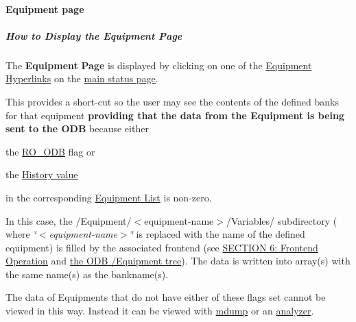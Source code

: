 \par
 \label{index_end}
\hypertarget{index_end}{}
 \paragraph{Equipment page}\label{RC_mhttpd_Equipment_page}
\label{RC_mhttpd_Equipment_page_idx_mhttpd_page_equipment}
\hypertarget{RC_mhttpd_Equipment_page_idx_mhttpd_page_equipment}{}
 \par




\par
\par
 \label{RC_mhttpd_Equipment_page_idx_Equipment_data_display}
\hypertarget{RC_mhttpd_Equipment_page_idx_Equipment_data_display}{}
 \hypertarget{RC_mhttpd_Equipment_page_RC_mhttpd_Equipment_var}{}\subparagraph{How to Display the Equipment Page}\label{RC_mhttpd_Equipment_page_RC_mhttpd_Equipment_var}
The {\bfseries Equipment} {\bfseries Page} is displayed by clicking on one of the \hyperlink{RC_mhttpd_Equipment_page_RC_mhttpd_Equipment_Hyperlink}{Equipment Hyperlinks} on the \hyperlink{RC_mhttpd_Main_Status_page_RC_mhttpd_main_status}{main status page}. \par
 This provides a short-\/cut so the user may see the contents of the defined banks for that equipment {\bfseries providing that the data from the Equipment is being sent to the ODB} because either


\begin{DoxyItemize}
\item the \hyperlink{FE_table_FE_tbl_ReadOn}{RO\_\-ODB} flag or
\item the \hyperlink{FE_table_FE_tbl_History}{History value}
\end{DoxyItemize}

in the corresponding \hyperlink{FrontendOperation_FE_Equipment_list}{Equipment List} is non-\/zero.

In this case, the /Equipment/$<$equipment-\/name$>$/Variables/ subdirectory ( where {\itshape  \char`\"{}$<$equipment-\/name$>$\char`\"{} \/} is replaced with the name of the defined equipment) is filled by the associated frontend (see \hyperlink{FrontendOperation}{SECTION 6: Frontend Operation} and \hyperlink{FE_ODB_equipment_tree}{the ODB /Equipment tree}). The data is written into array(s) with the same name(s) as the bankname(s).



 The data of Equipments that do not have either of these flags set cannot be viewed in this way. Instead it can be viewed with \hyperlink{RC_Monitor_RC_mdump_utility}{mdump} or an \hyperlink{DataAnalysis_DA_analyzer_utility}{analyzer}.

